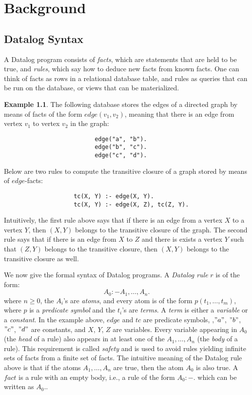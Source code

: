 \documentclass[twoside,11pt,openright]{report}
\theoremstyle{definition}
\newtheorem{exmp}{Example}[chapter]
\begin{document}

\chapter{Background}
\label{ch:background}

\section{Datalog Syntax}

A Datalog program consists of \textit{facts}, which are statements that are held to be true,
and \textit{rules}, which say how to deduce new facts from known facts. One can think of
facts as rows in a relational database table, and rules as queries that can be run on the
database, or views that can be materialized.


\begin{exmp}
  The following database stores the edges of a directed graph by means of facts of the form
  $edge(v_1, v_2)$, meaning that there is an edge from vertex $v_1$ to vertex $v_2$ in the graph:
  \begin{verbatim}
                          edge("a", "b").
                          edge("b", "c").
                          edge("c", "d").
  \end{verbatim}
  Below are two rules to compute the transitive closure of a graph stored by means of
  $edge$-facts:
  \begin{verbatim}
                    tc(X, Y) :- edge(X, Y).
                    tc(X, Y) :- edge(X, Z), tc(Z, Y).
  \end{verbatim}
  Intuitively, the first rule above says that if there is an edge from a vertex $X$ to a vertex $Y$,
  then $(X, Y)$ belongs to the transitive closure of the graph. The second rule says that if there is
  an edge from $X$ to $Z$ and there is exists a vertex $Y$ such that $(Z, Y)$ belongs to the transitive
  closure, then $(X, Y)$ belongs to the transitive closure as well.
\end{exmp}
\label{exmp:tc}

We now give the formal syntax of Datalog programs. A \textit{Datalog rule} $r$ is of the form:
$$A_0 :- A_1, \ldots, A_n.$$
where $n \geq 0$, the $A_i$'s are \textit{atoms}, and every atom is of the form $p(t_1, \ldots, t_m)$,
where $p$ is a \textit{predicate symbol} and the $t_i$'s are \textit{terms}. A \textit{term} is either
a \textit{variable} or a \textit{constant}. In the example above, $edge$ and $tc$ are predicate symbols,
,$"a"$, $"b"$, $"c"$, $"d"$ are constants, and $X$, $Y$, $Z$ are variables. Every variable appearing
in $A_0$ (the \textit{head} of a rule) also appears in at least one of the $A_1, \ldots, A_n$ (the \textit{body} of a rule).
This requirement is called \textit{safety}
and is used to avoid rules yielding infinite sets of facts from a finite set of facts.
The intuitive meaning of the Datalog rule above is that if
the atoms $A_1, \ldots, A_n$ are true, then the atom $A_0$ is also true.
A $fact$ is a rule with an empty body, i.e., a rule of the form $A_0 :-.$ which can be written as $A_0.$.
\end{document}
